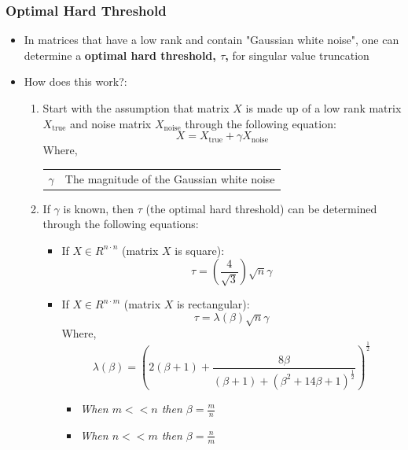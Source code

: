 \documentclass[11.5pt,a4paper]{article}
\makeatletter
\newenvironment{conditions}
  {\par\vspace{\abovedisplayskip}\noindent\begin{tabular}{>{$}l<{$} @{${}={}$} l}}
  {\end{tabular}\par\vspace{\belowdisplayskip}}
\makeatother
\begin{document}
\subsubsection*{Optimal Hard Threshold}

\begin{itemize}
    \item In matrices that have a low rank and contain "Gaussian white noise", one can determine a \textbf{optimal hard threshold, $\tau$,} for singular value truncation
    \item How does this work?:
    \begin{enumerate}
        \item Start with the assumption that matrix $X$ is made up of a low rank matrix $X_{\text{true}}$ and noise matrix $X_{\text{noise}}$ through the following equation:
        \begin{equation*}
            X = X_{\text{true}} + \gamma X_{\text{noise}}
        \end{equation*}
        Where,
        \begin{conditions}
            \gamma & The magnitude of the Gaussian white noise
        \end{conditions}
        \item If $\gamma$ is known, then $\tau$ (the optimal hard threshold) can be determined through the following equations:
        \begin{itemize}
            \item If $X \in R^{n \cdot n}$ (matrix $X$ is square):
            \begin{equation*}
                \tau = \left( \frac{4}{\sqrt{3}}\right)\sqrt{n}\gamma
            \end{equation*}
            \item If $X \in R^{n \cdot m}$ (matrix $X$ is rectangular):
            \begin{equation*}
                \tau = \lambda(\beta)\sqrt{n}\gamma
            \end{equation*}
            Where,
            \begin{equation*}
                \lambda(\beta) = \left( 2(\beta + 1) + \frac{8\beta}{(\beta + 1) + (\beta^2 + 14\beta + 1)^{\frac{1}{2}}} \right)^{\frac{1}{2}}
            \end{equation*}
            \begin{itemize}
                \item \textit{When $m << n$ then $\beta = \frac{m}{n}$}
                \item \textit{When $n << m$ then $\beta = \frac{n}{m}$}
            \end{itemize}
        \end{itemize}
    \end{enumerate}
\end{itemize}
\end{document}
